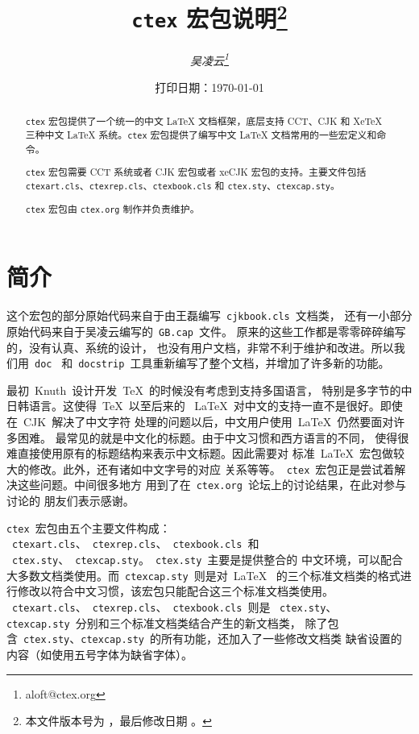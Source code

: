 \documentclass{ltxdoc}
\newcommand{\ctex}{\texttt{ctex}}
\newcommand{\ctexorg}{\texttt{ctex.org}}
\begin{document}
\title{\bf \ctex{} 宏包说明\thanks
  {本文件版本号为 \fileversion{}，最后修改日期 \filedate{}。}}
\author{\it 吴凌云\thanks{aloft@ctex.org}}
\date{\small 打印日期：\today}
\maketitle


\begin{abstract}
\ctex{} 宏包提供了一个统一的中文 \LaTeX{} 文档框架，底层支持 CCT、CJK 和 XeTeX 三种中文 \LaTeX{} 系统。\ctex{} 宏包提供了编写中文 \LaTeX{} 文档常用的一些宏定义和命令。

\ctex{} 宏包需要 CCT 系统或者 CJK 宏包或者 xeCJK 宏包的支持。主要文件包括 \texttt{ctexart.cls}、\texttt{ctexrep.cls}、\texttt{ctexbook.cls} 和 \texttt{ctex.sty}、\texttt{ctexcap.sty}。

\ctex{} 宏包由 \ctexorg{} 制作并负责维护。
\end{abstract}

\tableofcontents

\section{简介}

这个宏包的部分原始代码来自于由王磊编写~\texttt{cjkbook.cls}~文档类，
还有一小部分原始代码来自于吴凌云编写的~\texttt{GB.cap}~文件。
原来的这些工作都是零零碎碎编写的，没有认真、系统的设计，
也没有用户文档，非常不利于维护和改进。所以我们用~\texttt{doc}~
和~\texttt{docstrip}~工具重新编写了整个文档，并增加了许多新的功能。

最初~Knuth~设计开发~\TeX{}~的时候没有考虑到支持多国语言，
特别是多字节的中日韩语言。这使得~\TeX{}~以至后来的
~\LaTeX{}~对中文的支持一直不是很好。即使在~CJK~解决了中文字符
处理的问题以后，中文用户使用~\LaTeX{}~仍然要面对许多困难。
最常见的就是中文化的标题。由于中文习惯和西方语言的不同，
使得很难直接使用原有的标题结构来表示中文标题。因此需要对
标准~\LaTeX{}~宏包做较大的修改。此外，还有诸如中文字号的对应
关系等等。~\ctex{}~宏包正是尝试着解决这些问题。中间很多地方
用到了在~\ctexorg{}~论坛上的讨论结果，在此对参与讨论的
朋友们表示感谢。

\ctex{}~宏包由五个主要文件构成：
~\texttt{ctexart.cls}、~\texttt{ctexrep.cls}、~\texttt{ctexbook.cls}~和
~\texttt{ctex.sty}、~\texttt{ctexcap.sty}。~\texttt{ctex.sty}~主要是提供整合的
中文环境，可以配合大多数文档类使用。而~\texttt{ctexcap.sty}~则是对~\LaTeX{}~
的三个标准文档类的格式进行修改以符合中文习惯，该宏包只能配合这三个标准文档类使用。
~\texttt{ctexart.cls}、~\texttt{ctexrep.cls}、~\texttt{ctexbook.cls}~则是
~\texttt{ctex.sty}、\texttt{ctexcap.sty}~分别和三个标准文档类结合产生的新文档类，
除了包含~\texttt{ctex.sty}、\texttt{ctexcap.sty}~的所有功能，还加入了一些修改文档类
缺省设置的内容（如使用五号字体为缺省字体）。
\end{document}
